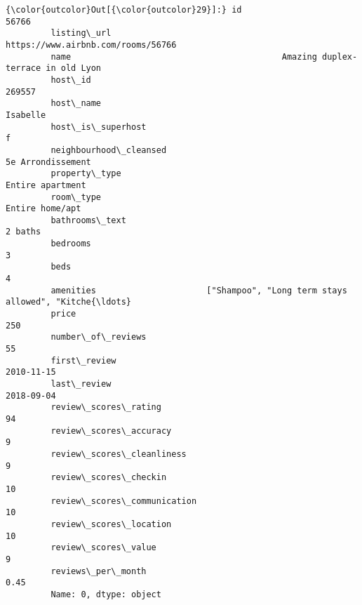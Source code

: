 \documentclass[11pt]{article}
\begin{document}
\begin{Verbatim}[commandchars=\\\{\}]
{\color{outcolor}Out[{\color{outcolor}29}]:} id                                                                         56766
         listing\_url                                   https://www.airbnb.com/rooms/56766
         name                                          Amazing duplex-terrace in old Lyon
         host\_id                                                                   269557
         host\_name                                                               Isabelle
         host\_is\_superhost                                                              f
         neighbourhood\_cleansed                                         5e Arrondissement
         property\_type                                                   Entire apartment
         room\_type                                                        Entire home/apt
         bathrooms\_text                                                           2 baths
         bedrooms                                                                       3
         beds                                                                           4
         amenities                      ["Shampoo", "Long term stays allowed", "Kitche{\ldots}
         price                                                                        250
         number\_of\_reviews                                                             55
         first\_review                                                          2010-11-15
         last\_review                                                           2018-09-04
         review\_scores\_rating                                                          94
         review\_scores\_accuracy                                                         9
         review\_scores\_cleanliness                                                      9
         review\_scores\_checkin                                                         10
         review\_scores\_communication                                                   10
         review\_scores\_location                                                        10
         review\_scores\_value                                                            9
         reviews\_per\_month                                                           0.45
         Name: 0, dtype: object
\end{Verbatim}
            
\end{document}
